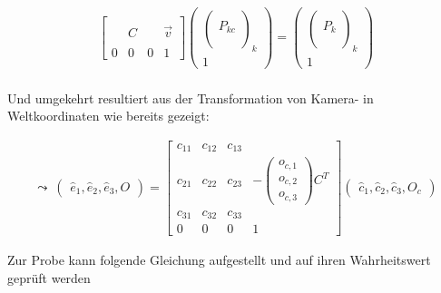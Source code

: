 \begin{gather}
\begin{bmatrix}
&  &  & \\
&  C&  &\vec{v} \\ 
&  &  & \\
0&0&0 & 1
\end{bmatrix}
\begin{pmatrix}
\begin{pmatrix}
\\
P_{kc}\\
\\
\end{pmatrix}_k\\
1
\end{pmatrix}
=
\begin{pmatrix}
\begin{pmatrix}
\\
P_k\\
\\
\end{pmatrix}_k\\
1
\end{pmatrix}
\end{gather}\\


Und umgekehrt resultiert aus der Transformation von Kamera- in Weltkoordinaten wie bereits gezeigt:

\begin{gather}
\leadsto \: \begin{pmatrix}
\hat{e}_1,\hat{e}_2,\hat{e}_3,O
\end{pmatrix} = 
\begin{bmatrix}
c_{11} & c_{12} & c_{13} & \\
c_{21} & c_{22} & c_{23} &  -\begin{pmatrix}
o_{c,1}\\
o_{c,2}\\
o_{c,3}
\end{pmatrix}C^T\\
c_{31} & c_{32} & c_{33} & \\
0&0&0 & 1
\end{bmatrix}
\begin{pmatrix}
\hat{c}_1,\hat{c}_2,\hat{c}_3,O_c
\end{pmatrix}
\end{gather}

%
Zur Probe kann folgende Gleichung aufgestellt und auf ihren Wahrheitswert geprüft werden 

